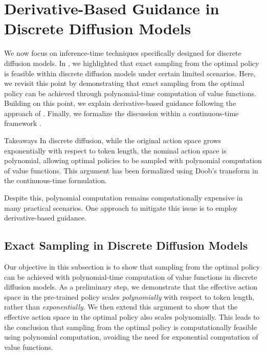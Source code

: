 \section{Derivative-Based Guidance in Discrete Diffusion Models} \label{sec:derivative_discrete}

We now focus on inference-time techniques specifically designed for discrete diffusion models. In , we highlighted that exact sampling from the optimal policy is feasible within discrete diffusion models under certain limited scenarios. Here, 
we revisit this point by demonstrating that exact sampling from the optimal policy can be achieved through polynomial-time computation of value functions. Building on this point, we explain derivative-based guidance following the approach of \citet{nisonoff2024unlocking}. Finally, we formalize the discussion within a continuous-time framework \citep{wang2024finetuning}.




\begin{AIbox}{Takeaways}
 In discrete diffusion, while the original action space grows exponentially with respect to token length, the nominal action space is polynomial, allowing optimal policies to be sampled with polynomial computation of value functions. This argument has been formalized using Doob's transform in the continuous-time formulation.

Despite this, polynomial computation remains computationally expensive in many practical scenarios. One approach to mitigate this issue is to employ derivative-based guidance.
\end{AIbox}

\subsection{Exact Sampling in Discrete Diffusion Models}\label{sec:discrete_first}

Our objective in this subsection is to show that sampling from the optimal policy can be achieved with polynomial-time computation of value functions in discrete diffusion models. 
As a preliminary step, we demonstrate that the effective action space in the pre-trained policy scales \emph{polynomially} with respect to token length, rather than \emph{exponentially}. We then extend this argument to show that the effective action space in the optimal policy also scales polynomially. This leads to the conclusion that sampling from the optimal policy is computationally feasible using polynomial computation, avoiding the need for exponential computation of value functions.   




